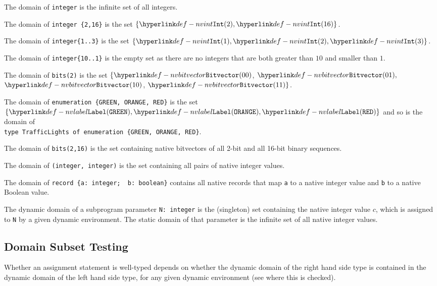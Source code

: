 \begin{mathpar}
\end{mathpar}

The domain of \texttt{integer} is the infinite set of all integers.

The domain of \verb|integer {2,16}| is the set $\{\nvint(2), \nvint(16)\}$.

The domain of \verb|integer{1..3}| is the set $\{\nvint(1), \nvint(2), \nvint(3)\}$.

The domain of \verb|integer{10..1}| is the empty set as there are no integers that are
both greater than $10$ and smaller than $1$.

The domain of \texttt{bits(2)} is the set $\{\nvbitvector(00)$, $\nvbitvector(01),$
$\nvbitvector(10)$, $\nvbitvector(11)\}$.

The domain of \verb|enumeration {GREEN, ORANGE, RED}| is the set \\
$\{\nvlabel(\texttt{GREEN}), \nvlabel(\texttt{ORANGE}), \nvlabel(\texttt{RED})\}$ and so is the domain
of \\
\verb|type TrafficLights of enumeration {GREEN, ORANGE, RED}|.

The domain of \texttt{bits({2,16})} is the set containing native bitvectors of all 2-bit and all 16-bit binary sequences.

The domain of \texttt{(integer, integer)} is the set containing all pairs of native integer values.

The domain of \verb|record {a: integer;  b: boolean}| contains all native records
that map \texttt{a} to a native integer value and \texttt{b} to a native Boolean value.

The dynamic domain of a subprogram parameter \texttt{N: integer} is the (singleton) set containing
the native integer value $c$,
which is assigned to \texttt{N} by a given dynamic environment. The static domain of that parameter
is the infinite set of all native integer values.

  
    
    
   

\subsection{Domain Subset Testing\label{sec:domainsubsettesting}}
Whether an assignment statement is well-typed depends on whether the dynamic domain of the
right hand side type is contained in the dynamic domain of the left hand side type,
for any given dynamic environment
(see  where this is checked).

